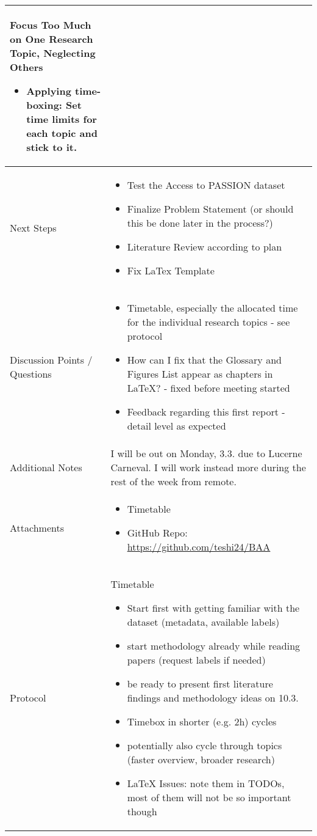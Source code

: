 \documentclass[a4paper,11pt]{article}
\begin{document}
\begin{longtable}{|p{4cm}|p{10cm}|}
		Focus Too Much on One Research Topic, Neglecting Others
		\begin{itemize}
			\item Applying time-boxing: Set time limits for each topic and stick to it.
		\end{itemize} \\
		
		\hline
		Next Steps & \begin{itemize}
			\item Test the Access to PASSION dataset
			\item Finalize Problem Statement (or should this be done later in the process?)
			\item Literature Review according to plan
			\item Fix LaTex Template
		\end{itemize} \\
		\hline
		Discussion Points / Questions & \begin{itemize}
			\item Timetable, especially the allocated time for the individual research topics - see protocol
			\item How can I fix that the Glossary and Figures List appear as chapters in LaTeX? - fixed before meeting started
			\item Feedback regarding this first report - detail level as expected
		\end{itemize} \\
		\hline
		Additional Notes & I will be out on Monday, 3.3. due to Lucerne Carneval. I will work instead more during the rest of the week from remote. \\
		\hline
		Attachments  & \begin{itemize}
			\item Timetable
			\item GitHub Repo: \href{https://github.com/teshi24/BAA}{https://github.com/teshi24/BAA}
		\end{itemize} \\
		\hline
		Protocol  & 
		Timetable
		\begin{itemize}
			\item Start first with getting familiar with the dataset (metadata, available labels)
			\item start methodology already while reading papers (request labels if needed)
			\item be ready to present first literature findings and methodology ideas on 10.3.
			\item Timebox in shorter (e.g. 2h) cycles
			\item potentially also cycle through topics (faster overview, broader research)
			\item LaTeX Issues: note them in TODOs, most of them will not be so important though
		\end{itemize}
		

\end{longtable}
\end{document}
